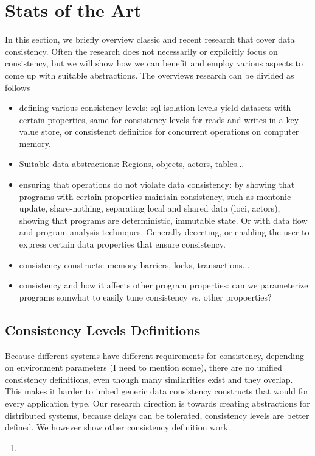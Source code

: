 \documentclass[]{usiinfprospectus}
\begin{document}
\section{Stats of the Art}
In this section, we briefly overview classic and recent research that cover data consistency. Often the research does not necessarily or explicitly focus on consistency, but we will show how we can benefit and employ various aspects to come up with suitable abstractions. The overviews research can be divided as follows 
\begin{itemize}
	\item defining various consistency levels: sql isolation levels yield datasets with certain properties, same for consistency levels for reads and writes in a key-value store, or consistenct definitios for concurrent operations on computer memory. 
	\item Suitable data abstractions: Regions, objects, actors, tables...
	\item ensuring that operations do not violate data consistency: by showing that programs with certain properties maintain consistency, such as montonic update, share-nothing, separating local and shared data (loci, actors), showing that programs are deterministic, immutable state. Or with data flow and program analysis techniques. Generally dececting, or enabling the user to express certain data properties that ensure consistency. 
	\item consistency constructs: memory barriers, locks, transactions...
	\item consistency and how it affects other program properties: can we parameterize programs somwhat to easily tune consistency vs. other propoerties?
\end{itemize}

\subsection{Consistency Levels Definitions}
Because different systems have different requirements for consistency, depending on environment parameters (I need to mention some), there are no unified consistency definitions, even though many similarities exist and they overlap. This makes it harder to imbed generic data consistency constructs that would for every application type. Our research direction is towards creating abstractions for distributed systems, because delays can be tolerated, consistency levels are better defined. We however show other consistency definition work.

\begin{enumerate}
	\item 
\end{enumerate}



\end{document}
